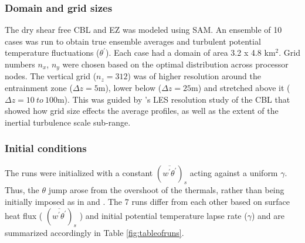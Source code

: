 \documentclass[referee]{svjour3}
\begin{document}
\subsubsection{Domain and grid sizes}
The dry shear free CBL and EZ was modeled using SAM.  An ensemble of 10 cases was run to obtain true ensemble averages and turbulent potential temperature fluctuations ($\theta^{'}$). Each case had a domain of area 3.2 x 4.8 km$^{2}$.  Grid numbers $n_{x}$, $n_{y}$ were chosen based on the optimal distribution across processor nodes. The vertical grid ($n_{z}=312$) was of higher resolution around the entrainment zone ($\Delta z = 5$m), lower below ($\Delta z = 25$m) and stretched above it ($\Delta z = 10 \ to \ 100 $m). This was guided by \cite{SullPat}'s LES resolution study of the CBL that showed how grid size effects the average profiles, as well as the extent of the inertial turbulence scale sub-range.\\

\subsubsection{Initial conditions}

The runs were initialized with a constant $(\overline{w^{'}\theta^{'}})_{s}$ acting against a uniform $\gamma$.  Thus, the  $\theta$ jump arose from the overshoot of the thermals, rather than being initially imposed as in \cite{Sullivan98} and \cite{Brooks12}.  The 7 runs differ from each other based on surface heat flux ( $(\overline{w^{'}\theta^{'}})_{s}$ ) and initial potential temperature lapse rate ($\gamma$) and are summarized accordingly in Table \ref{fig:tableofruns}.
\end{document}
